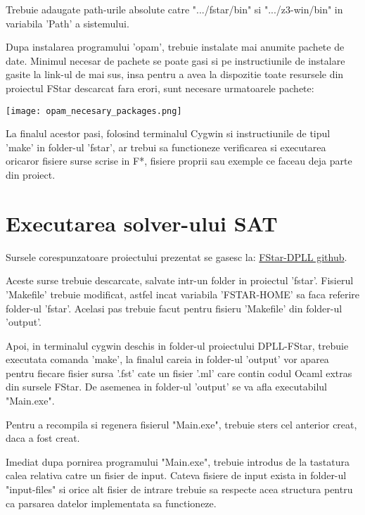 Trebuie adaugate path-urile absolute catre ".../fstar/bin" si ".../z3-win/bin" in variabila 'Path' a sistemului.

Dupa instalarea programului 'opam', trebuie instalate mai anumite pachete de date. Minimul necesar de pachete se poate gasi si pe instructiunile de instalare gasite la link-ul de mai sus, insa pentru a avea la dispozitie toate resursele din proiectul FStar descarcat fara erori, sunt necesare urmatoarele pachete: 
\newline

\texttt{[image: opam\_necesary\_packages.png]}
\newline

La finalul acestor pasi, folosind terminalul Cygwin si instructiunile de tipul 'make' in folder-ul 'fstar', ar trebui sa functioneze verificarea si executarea oricaror fisiere surse scrise in F*, fisiere proprii sau exemple ce faceau deja parte din proiect.

\newpage

\section{Executarea solver-ului SAT}

Sursele corespunzatoare proiectului prezentat se gasesc la:
\href{https://github.com/alex4482/FStar-DPLL-licenta/tree/main/dpll_optimized}{FStar-DPLL github}.

Aceste surse trebuie descarcate, salvate intr-un folder in proiectul 'fstar'. \newline Fisierul 'Makefile' trebuie modificat, astfel incat variabila 'FSTAR-HOME'  sa faca \newline referire folder-ul 'fstar'. Acelasi pas trebuie facut pentru fisieru 'Makefile' din \newline folder-ul 'output'.

Apoi, in terminalul cygwin deschis in folder-ul proiectului DPLL-FStar, trebuie executata comanda 'make', la finalul careia in folder-ul 'output' vor aparea pentru \newline fiecare fisier sursa '.fst' cate un fisier '.ml' care contin codul Ocaml extras din sursele FStar. De asemenea in folder-ul 'output' se va afla executabilul "Main.exe".

Pentru a recompila si regenera fisierul "Main.exe", trebuie sters cel anterior creat, daca a fost creat.

Imediat dupa pornirea programului "Main.exe", trebuie introdus de la tastatura calea relativa catre un fisier de input. Cateva fisiere de input exista in folder-ul \newline "input-files" si orice alt fisier de intrare trebuie sa respecte acea structura pentru ca parsarea datelor implementata sa functioneze.

